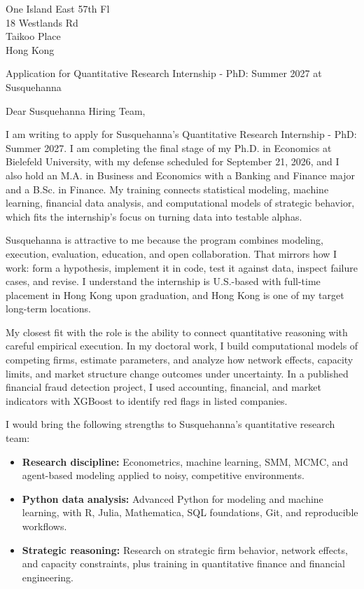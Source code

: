 \documentclass[11pt]{article}
\begin{document}
\vspace{0.1cm}

\noindent
One Island East 57th Fl \\
18 Westlands Rd \\
Taikoo Place \\
Hong Kong

\vspace{0.1cm}

\noindent
Application for Quantitative Research Internship - PhD: Summer 2027 at Susquehanna \\

\vspace{0.05cm}

\noindent Dear Susquehanna Hiring Team,

I am writing to apply for Susquehanna's Quantitative Research Internship - PhD: Summer 2027. 
I am completing the final stage of my Ph.D. in Economics at Bielefeld University, with my defense scheduled for September 21, 2026, 
and I also hold an M.A. in Business and Economics with a Banking and Finance major and a B.Sc. in Finance. 
My training connects statistical modeling, machine learning, financial data analysis, and computational models of strategic behavior, 
which fits the internship's focus on turning data into testable alphas.

Susquehanna is attractive to me because the program combines modeling, execution, evaluation, education, and open collaboration. 
That mirrors how I work: form a hypothesis, implement it in code, test it against data, inspect failure cases, and revise. 
I understand the internship is U.S.-based with full-time placement in Hong Kong upon graduation, and Hong Kong is one of my target long-term locations.

My closest fit with the role is the ability to connect quantitative reasoning with careful empirical execution. 
In my doctoral work, I build computational models of competing firms, estimate parameters, and analyze how network effects, capacity limits, and market structure change outcomes under uncertainty. 
In a published financial fraud detection project, I used accounting, financial, and market indicators with XGBoost to identify red flags in listed companies.

I would bring the following strengths to Susquehanna's quantitative research team:

\begin{itemize}
    \item \textbf{Research discipline:} Econometrics, machine learning, SMM, MCMC, and agent-based modeling applied to noisy, competitive environments.
    \item \textbf{Python data analysis:} Advanced Python for modeling and machine learning, with R, Julia, Mathematica, SQL foundations, Git, and reproducible workflows.
    \item \textbf{Strategic reasoning:} Research on strategic firm behavior, network effects, and capacity constraints, plus training in quantitative finance and financial engineering.
\end{itemize}
\end{document}
